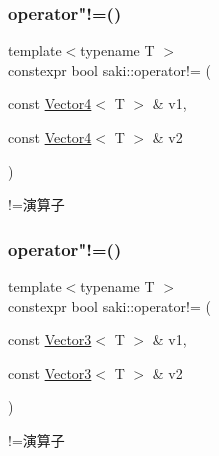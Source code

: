 \mbox{\label{namespacesaki_a0d4a71a1a84ddfe22acf3ffd305f1449}} 
\subsubsection{\texorpdfstring{operator"!=()}{operator!=()}\hspace{0.1cm}{\footnotesize\ttfamily [2/10]}}
{\footnotesize\ttfamily template$<$typename T $>$ \\
constexpr bool saki\+::operator!= (\begin{DoxyParamCaption}\item[{const \mbox{\hyperlink{classsaki_1_1_vector4}{Vector4}}$<$ T $>$ \&}]{v1,  }\item[{const \mbox{\hyperlink{classsaki_1_1_vector4}{Vector4}}$<$ T $>$ \&}]{v2 }\end{DoxyParamCaption})}



!=演算子 

\mbox{\label{namespacesaki_a49b3805c2b97e135606939b8d64eca20}} 
\subsubsection{\texorpdfstring{operator"!=()}{operator!=()}\hspace{0.1cm}{\footnotesize\ttfamily [3/10]}}
{\footnotesize\ttfamily template$<$typename T $>$ \\
constexpr bool saki\+::operator!= (\begin{DoxyParamCaption}\item[{const \mbox{\hyperlink{classsaki_1_1_vector3}{Vector3}}$<$ T $>$ \&}]{v1,  }\item[{const \mbox{\hyperlink{classsaki_1_1_vector3}{Vector3}}$<$ T $>$ \&}]{v2 }\end{DoxyParamCaption})}



!=演算子 

\mbox{\label{namespacesaki_a6ff1956703c2dfeebb0d188d9c34b033}} 
